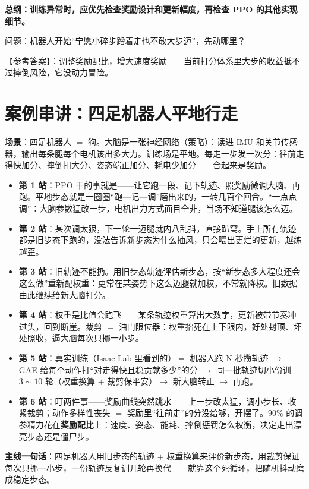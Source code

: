 \documentclass[UTF8,12pt,a4paper]{ctexrep}
\newcommand{\pin}[1]{\begin{pinbox}#1\end{pinbox}}
\newcommand{\selfcheck}[1]{\begin{checkb}#1\end{checkb}}
\begin{document}
\pin{\textbf{总纲：训练异常时，应优先检查奖励设计和更新幅度，再检查 PPO 的其他实现细节。}}

\selfcheck{问题：机器人开始``宁愿小碎步蹭着走也不敢大步迈''，先动哪里？
	
【参考答案】：调整奖励配比，增大速度奖励——当前打分体系里大步的收益抵不过摔倒风险，它没动力冒险。}

\section{案例串讲：四足机器人平地行走}

\textbf{场景}：四足机器人 $=$ 狗。大脑是一张神经网络（策略）：读进 IMU 和关节传感器，输出每条腿每个电机该出多大力。训练场是平地。每走一步发一次分：往前走得快加分、摔倒扣大分、姿态端正加分、耗电少加分——合起来是奖励。

\begin{itemize}[nosep]
  \item \textbf{第 1 站}：PPO 干的事就是——让它跑一段、记下轨迹、照奖励微调大脑、再跑。平地步态就是一圈圈``跑—记—调''磨出来的，一转几百个回合。``一点点调''：大脑参数猛改一步，电机出力方式面目全非，当场不知道腿该怎么迈。
  \item \textbf{第 2 站}：某次调太狠，下一轮一迈腿就内八乱抖，直接趴窝。手上所有轨迹都是旧步态下跑的，没法告诉新步态为什么抽风，只会喂出更烂的更新，越练越歪。
  \item \textbf{第 3 站}：旧轨迹不能扔。用旧步态轨迹评估新步态，按``新步态多大程度还会这么做''重新配权重：更常在某姿势下这么迈腿就加权，不常就降权。旧数据由此继续给新大脑打分。
  \item \textbf{第 4 站}：权重是比值会跑飞——某条轨迹权重算出大数字，更新被带节奏冲过头，回到断崖。裁剪 $=$ 油门限位器：权重掐死在上下限内，好处封顶、坏处照收，逼大脑每次只挪一小步。
  \item \textbf{第 5 站}：真实训练（Isaac Lab 里看到的）$=$ 机器人跑 N 秒攒轨迹 $\to$ GAE 给每个动作打``对走得快且稳贡献多少''的分 $\to$ 同一批轨迹切小份训 $3\sim10$ 轮（权重换算 $+$ 裁剪保平安）$\to$ 新大脑转正 $\to$ 再跑。
  \item \textbf{第 6 站}：盯两件事——奖励曲线突然跳水 $=$ 上一步改太猛，调小步长、收紧裁剪；动作多样性丧失 $=$ 奖励里``往前走''的分没给够，开摆了。$90\%$ 的调参精力花在\textbf{奖励配比}上：速度、姿态、能耗、摔倒惩罚怎么权衡，决定走出漂亮步态还是僵尸步。
\end{itemize}

\pin{\textbf{主线一句话}：四足机器人用旧步态的轨迹 $+$ 权重换算来评价新步态，用裁剪保证每次只挪一小步，一份轨迹反复训几轮再换代——就靠这个死循环，把随机抖动磨成稳定步态。}
\end{document}
